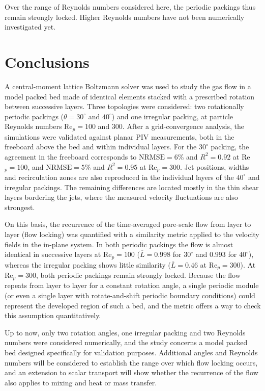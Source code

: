 Over the range of Reynolds numbers considered here, the periodic packings thus remain strongly locked. Higher Reynolds numbers have not been numerically investigated yet.

\section{Conclusions}

A central-moment lattice Boltzmann solver was used to study the gas flow in a model packed bed made of identical elements stacked with a prescribed rotation between successive layers. Three topologies were considered: two rotationally periodic packings ($\theta=30^\circ$ and $40^\circ$) and one irregular packing, at particle Reynolds numbers Re$_p=100$ and $300$. After a grid-convergence analysis, %
the simulations were validated against planar PIV measurements, both in the freeboard above the bed and within individual layers. For the $30^\circ$ packing, the agreement in the freeboard corresponds to $\mathrm{NRMSE}=6\%$ and $R^2=0.92$ at Re$_p=100$, and $\mathrm{NRMSE}=5\%$ and $R^2=0.95$ at Re$_p=300$. Jet positions, widths and recirculation zones are also reproduced in the individual layers of the $40^\circ$ and irregular packings. The remaining differences are located mostly in the thin shear layers bordering the jets, where the measured velocity fluctuations are also strongest.

On this basis, the recurrence of the time-averaged pore-scale flow from layer to layer (flow locking) was quantified with a similarity metric applied to the velocity fields in the in-plane system. In both periodic packings the flow is almost identical in successive layers at Re$_p=100$ ($\overline{L}=0.998$ for $30^\circ$ and $0.993$ for $40^\circ$), whereas the irregular packing shows little similarity ($\overline{L}=0.46$ at Re$_p=300$). At Re$_p=300$, both periodic packings remain strongly locked. Because the flow repeats from layer to layer for a constant rotation angle, a single periodic module (or even a single layer with rotate-and-shift periodic boundary conditions) could represent the developed region of such a bed, and the metric offers a way to check this assumption quantitatively.

Up to now, only two rotation angles, one irregular packing and two Reynolds numbers were considered numerically, and the study concerns a model packed bed designed specifically for validation purposes. Additional angles and Reynolds numbers will be considered to establish the range over which flow locking occurs, and an extension to scalar transport will show whether the recurrence of the flow also applies to mixing and heat or mass transfer.

